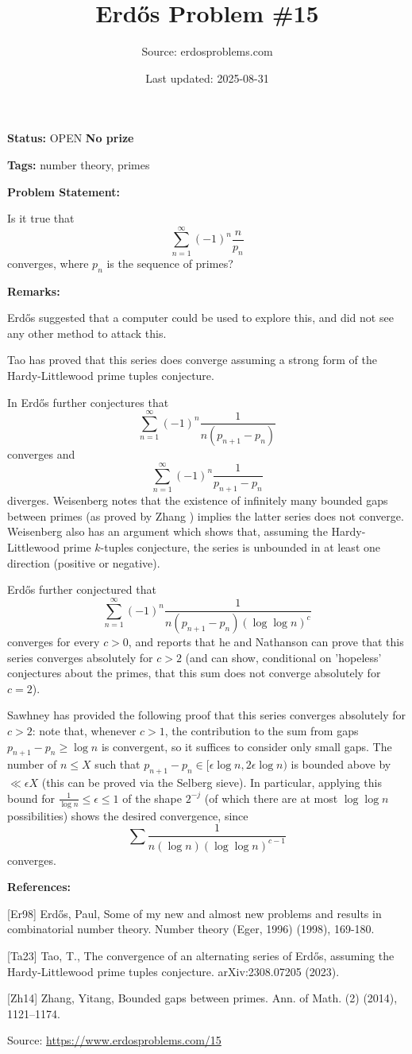\documentclass{article}
\title{Erd\H{o}s Problem \#15}
\date{Last updated: 2025-08-31}
\author{Source: erdosproblems.com}
\begin{document}
\maketitle

\noindent\textbf{Status:} OPEN \quad \textbf{No prize}

\noindent\textbf{Tags:} number theory, primes

\medskip
\noindent\textbf{Problem Statement:}

Is it true that\[\sum_{n=1}^\infty(-1)^n\frac{n}{p_n}\]converges, where $p_n$ is the sequence of primes?

\bigskip
\noindent\textbf{Remarks:}

Erd\H{o}s suggested that a computer could be used to explore this, and did not see any other method to attack this.

Tao \cite{Ta23} has proved that this series does converge assuming a strong form of the Hardy-Littlewood prime tuples conjecture.

In \cite{Er98} Erd\H{o}s further conjectures that\[\sum_{n=1}^\infty (-1)^n \frac{1}{n(p_{n+1}-p_n)}\]converges and\[\sum_{n=1}^\infty (-1)^n \frac{1}{p_{n+1}-p_n}\]diverges. Weisenberg notes that the existence of infinitely many bounded gaps between primes (as proved by Zhang \cite{Zh14}) implies the latter series does not converge. Weisenberg also has an argument which shows that, assuming the Hardy-Littlewood prime $k$-tuples conjecture, the series is unbounded in at least one direction (positive or negative).

Erd\H{o}s further conjectured that\[\sum_{n=1}^\infty (-1)^n \frac{1}{n(p_{n+1}-p_n)(\log\log n)^c}\]converges for every $c>0$, and reports that he and Nathanson can prove that this series converges absolutely for $c>2$ (and can show, conditional on 'hopeless' conjectures about the primes, that this sum does not converge absolutely for $c=2$).

Sawhney has provided the following proof that this series converges absolutely for $c>2$: note that, whenever $c>1$, the contribution to the sum from gaps $p_{n+1}-p_n\geq \log n$ is convergent, so it suffices to consider only small gaps. The number of $n\leq X$ such that $p_{n+1}-p_n\in [\epsilon\log n,2\epsilon \log n)$ is bounded above by $\ll \epsilon X$ (this can be proved via the Selberg sieve). In particular, applying this bound for $\frac{1}{\log n}\leq \epsilon \leq 1$ of the shape $2^{-j}$ (of which there are at most $\log\log n$ possibilities) shows the desired convergence, since\[\sum \frac{1}{n(\log n)(\log\log n)^{c-1}}\]converges.

\bigskip
\noindent\textbf{References:}

[Er98] Erd\H{o}s, Paul, Some of my new and almost new problems and results in combinatorial number theory. Number theory (Eger, 1996) (1998), 169-180.
 
 [Ta23] Tao, T., The convergence of an alternating series of Erd\H{o}s, assuming the Hardy-Littlewood prime tuples conjecture. arXiv:2308.07205 (2023).
 
 [Zh14] Zhang, Yitang, Bounded gaps between primes. Ann. of Math. (2) (2014), 1121--1174.

\bigskip
\noindent\small{Source: \url{https://www.erdosproblems.com/15}}
\end{document}
